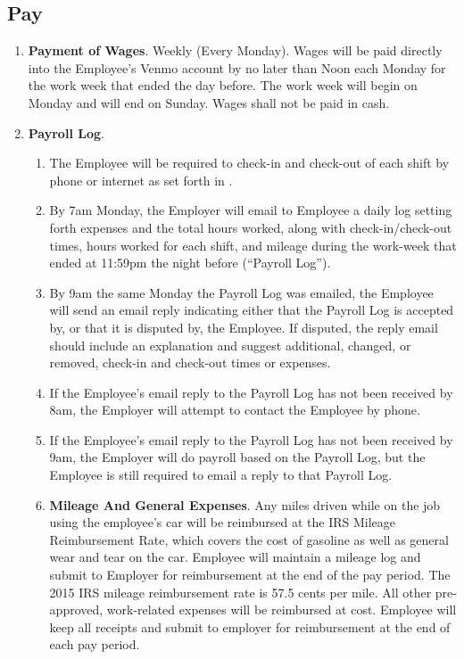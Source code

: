 \documentclass[]{article}
\begin{document}
\subsection*{Pay}
\begin{enumerate}
	\item{\textbf{Payment of Wages}}. Weekly (Every Monday). Wages will be paid directly into the Employee's Venmo account by no later than Noon each Monday for the work week that ended the day before. The work week will begin on Monday and will end on Sunday. Wages shall not be paid in cash.
	\item{\textbf{Payroll Log}}. 
		\begin{enumerate}
			\item The Employee will be required to check-in and check-out of each shift by phone or internet as set forth in . 
			\item By 7am Monday, the Employer will email to Employee a daily log setting forth expenses and the total hours worked, along with check-in/check-out times, hours worked for each shift, and mileage during the work-week that ended at 11:59pm the night before (``Payroll Log'').
			\item By 9am the same Monday the Payroll Log was emailed, the Employee will send an email reply indicating either that the Payroll Log is accepted by, or that it is disputed by, the Employee. If disputed, the reply email should include an explanation and suggest additional, changed, or removed, check-in and check-out times or expenses.
			\item If the Employee's email reply to the Payroll Log has not been received by 8am, the Employer will attempt to contact the Employee by phone.
			\item If the Employee's email reply to the Payroll Log has not been received by 9am, the Employer will do payroll based on the Payroll Log, but the Employee is still required to email a reply to that Payroll Log.
	\item{\textbf{Mileage And General Expenses}}. Any miles driven while on the job using the employee's car will be reimbursed at the IRS Mileage Reimbursement Rate, which covers the cost of gasoline as well as general wear and tear on the car. Employee will maintain a mileage log and submit to Employer for reimbursement at the end of the pay period. The 2015 IRS mileage reimbursement rate is 57.5 cents per mile.  All other pre-approved, work-related expenses will be reimbursed at cost. Employee will keep all receipts and submit to employer for reimbursement at the end of each pay period.

\end{enumerate}
\end{enumerate}
\end{document}
